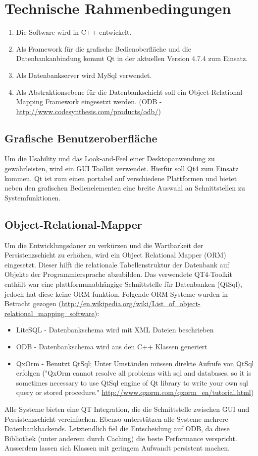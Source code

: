 \documentclass[a4paper,10pt]{article}
\begin{document}
\section{Technische Rahmenbedingungen}
\begin{enumerate}
	\item Die Software wird in C++ entwickelt.
	\item Als Framework für die grafische Bedienoberfläche und die Datenbankanbindung kommt Qt in der aktuellen Version 4.7.4 zum Einsatz.
	\item Als Datenbankserver wird MySql verwendet.
	\item Als Abstraktionsebene für die Datenbankschicht soll ein Object-Relational-Mapping Framework eingesetzt werden. (ODB - \url{http://www.codesynthesis.com/products/odb/})
\end{enumerate}

\subsection{Grafische Benutzeroberfläche}
Um die Usability und das Look-and-Feel einer Desktopanwendung zu gewährleisten, wird ein GUI Toolkit verwendet.
Hierfür soll Qt4 zum Einsatz kommen. Qt ist zum einen portabel auf verschiedene Plattformen und bietet neben den grafischen Bedienelementen eine breite Auswahl an Schnittstellen zu Systemfunktionen.

\subsection{Object-Relational-Mapper}
Um die Entwicklungsdauer zu verkürzen und die Wartbarkeit der Persistenzschicht zu erhöhen, wird ein Object Relational Mapper (ORM) eingesetzt. Dieser hilft die relationale Tabellenstruktur der Datenbank auf Objekte der Programmiersprache abzubilden.
Das verwendete QT4-Toolkit enthält war eine plattformunabhängige Schnittstelle für Datenbanken (QtSql), jedoch hat diese keine ORM funktion.
Folgende ORM-Systeme wurden in Betracht gezogen (\url{http://en.wikipedia.org/wiki/List_of_object-relational_mapping_software}):
\begin{itemize}
	\item LiteSQL - Datenbankschema wird mit XML Dateien beschrieben
	\item ODB - Datenbankschema wird aus den C++ Klassen generiert
	\item QxOrm - Benutzt QtSql; Unter Umständen müssen direkte Aufrufe von QtSql erfolgen ("QxOrm cannot resolve all problems with sql and databases, so it is sometimes necessary to use QtSql engine of Qt library to write your own sql query or stored procedure." \url{http://www.qxorm.com/qxorm_en/tutorial.html})
\end{itemize}
Alle Systeme bieten eine QT Integration, die die Schnittstelle zwischen GUI und Persistenzschicht vereinfachen. Ebenso unterstützen alle Systeme mehrere Datenbankbackends.
Letztendlich fiel die Entscheidung auf ODB, da diese Bibliothek (unter anderem durch Caching) die beste Performance verspricht. Ausserdem lassen sich Klassen mit geringem Aufwandt persistent machen.
\end{document}
